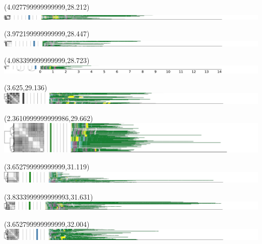 \documentclass{article}
\begin{document}
\begin{textblock}{13}(4.027799999999999,28.212)\includegraphics{latex/figures/haplotypes-constrained/chr19-HG005.pdf}\end{textblock}
\begin{textblock}{13}(3.972199999999999,28.447)\includegraphics{latex/figures/haplotypes-constrained/chr19-HG006.pdf}\end{textblock}
\begin{textblock}{13}(4.083399999999999,28.723)\includegraphics{latex/figures/haplotypes-constrained/chr19-HG007.pdf}\end{textblock}
\begin{textblock}{13}(3.625,29.136)\includegraphics{latex/figures/haplotypes-constrained/chr21-HG001.pdf}\end{textblock}
\begin{textblock}{13}(2.3610999999999986,29.662)\includegraphics{latex/figures/haplotypes-constrained/chr21-HG002.pdf}\end{textblock}
\begin{textblock}{13}(3.652799999999999,31.119)\includegraphics{latex/figures/haplotypes-constrained/chr21-HG003.pdf}\end{textblock}
\begin{textblock}{13}(3.8333999999999993,31.631)\includegraphics{latex/figures/haplotypes-constrained/chr21-HG004.pdf}\end{textblock}
\begin{textblock}{13}(3.652799999999999,32.004)\includegraphics{latex/figures/haplotypes-constrained/chr21-HG005.pdf}\end{textblock}
\end{document}

